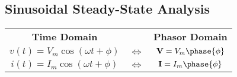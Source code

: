 
\newpage
\subsection{Sinusoidal Steady-State Analysis}%
\label{sub:sinusoidal-steady-state-analysis}

\begin{multicols}{2}

    \begin{CheatsheetEntryFrame}


        \newcommand{\X}{\hphantom{x}} %
        \begin{tabularx}{\textwidth}{ccC}
            {\scriptsize \textbf{Time Domain}}   &                             & {\scriptsize \textbf{Phasor Domain}} \\
            \X $v(t) = V_m \cos{(\omega t + \phi)}$ \X & $\Longleftrightarrow$ & $\mathbf{V} = V_m \phase{\phi}$      \\
            \X $i(t) = I_m \cos{(\omega t + \phi)}$ \X & $\Longleftrightarrow$ & $\mathbf{I} = I_m \phase{\phi}$      \\
        \end{tabularx}



\end{CheatsheetEntryFrame}
\end{multicols}
